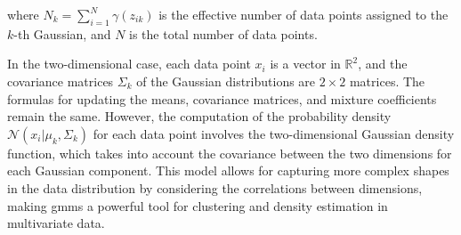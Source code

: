 where \(N_k = \sum_{i=1}^{N} \gamma(z_{ik})\) is the effective number of data points assigned to the \(k\)-th Gaussian, and \(N\) is the total number of data points.

In the two-dimensional case, each data point \(x_i\) is a vector in \(\mathbb{R}^2\), and the covariance matrices \(\Sigma_k\) of the Gaussian distributions are \(2 \times 2\) matrices. The formulas for updating the means, covariance matrices, and mixture coefficients remain the same. However, the computation of the probability density \(\mathcal{N}(x_i | \mu_k, \Sigma_k)\) for each data point involves the two-dimensional Gaussian density function, which takes into account the covariance between the two dimensions for each Gaussian component.
This model allows for capturing more complex shapes in the data distribution by considering the correlations between dimensions, making \acrshort{gmm}s a powerful tool for clustering and density estimation in multivariate data.


